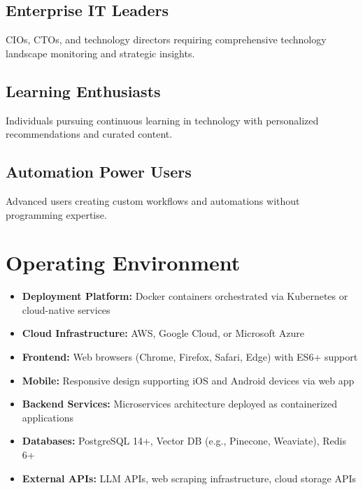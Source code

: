 \documentclass{report}
\begin{document}
\subsection{Enterprise IT Leaders}
CIOs, CTOs, and technology directors requiring comprehensive technology landscape monitoring and strategic insights.

\subsection{Learning Enthusiasts}
Individuals pursuing continuous learning in technology with personalized recommendations and curated content.

\subsection{Automation Power Users}
Advanced users creating custom workflows and automations without programming expertise.

\section{Operating Environment}
\begin{itemize}
    \item \textbf{Deployment Platform:} Docker containers orchestrated via Kubernetes or cloud-native services
    \item \textbf{Cloud Infrastructure:} AWS, Google Cloud, or Microsoft Azure
    \item \textbf{Frontend:} Web browsers (Chrome, Firefox, Safari, Edge) with ES6+ support
    \item \textbf{Mobile:} Responsive design supporting iOS and Android devices via web app
    \item \textbf{Backend Services:} Microservices architecture deployed as containerized applications
    \item \textbf{Databases:} PostgreSQL 14+, Vector DB (e.g., Pinecone, Weaviate), Redis 6+
    \item \textbf{External APIs:} LLM APIs, web scraping infrastructure, cloud storage APIs
\end{itemize}
\end{document}
